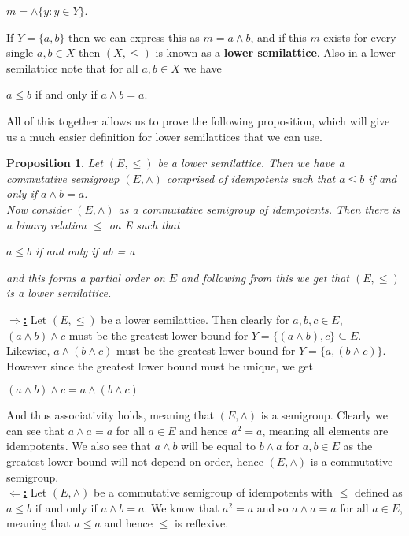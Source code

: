 \documentclass[12pt]{article}
\newtheorem{prop}[theorem]{Proposition}
\begin{document}
	\begin{center}
		$m = \wedge \{y:y \in Y\}$.
	\end{center}
If $Y = \{a,b\}$ then we can express this as $m = a \wedge b$, and if this $m$ exists for every single $a,b \in X$ then $(X,\leq)$ is known as a \textbf{lower semilattice}. Also in a lower semilattice note that for all $a,b \in X$ we have
	\begin{center}
		$a \leq b$ if and only if $a \wedge b = a$\qquad\cite{3}.
	\end{center}
All of this together allows us to prove the following proposition, which will give us a much easier definition for lower semilattices that we can use.
\begin{prop}\label{semilattice}
	Let $(E,\leq)$ be a lower semilattice. Then we have a commutative semigroup $(E,\wedge)$ comprised of idempotents such that $a \leq b$ if and only if $a \wedge b = a$.\\
	Now consider $(E, \wedge)$ as a commutative semigroup of idempotents. Then there is a binary relation $\leq$ on E such that
	\begin{center}
		$a\leq b$ if and only if ab = a
	\end{center}
	and this forms a partial order on $E$ and following from this we get that $(E,\leq)$ is a lower semilattice.
\end{prop}
\proof
	\textbf{\underline{$\Rightarrow$:}}
	Let $(E,\leq)$ be a lower semilattice. Then clearly for $a,b,c \in E$, $(a \wedge b) \wedge c$ must be the greatest lower bound for $Y = \{(a \wedge b),c\} \subseteq E$. Likewise, $a \wedge (b \wedge c)$ must be the greatest lower bound for $Y = \{a, (b \wedge c)\}$. However since the greatest lower bound must be unique, we get
	\begin{center}
		$(a \wedge b) \wedge c = a \wedge (b \wedge c)$
	\end{center}
	And thus associativity holds, meaning that $(E, \wedge)$ is a semigroup\cite{3}. Clearly we can see that $a \wedge a = a$ for all $a \in E$ and hence $a^2 = a$, meaning all elements are idempotents. We also see that $a \wedge b$ will be equal to $b \wedge a$ for $a,b \in E$ as the greatest lower bound will not depend on order, hence $(E,\wedge)$ is a commutative semigroup.\\
	\textbf{\underline{$\Leftarrow$:}}
	Let $(E,\wedge)$ be a commutative semigroup of idempotents with $\leq$ defined as $a\leq b$ if and only if $a \wedge b = a$. We know that $a^2 = a$ and so $a\wedge a=a$ for all $a \in E$, meaning that $a \leq a$ and hence $\leq$ is reflexive.\\
\end{document}
